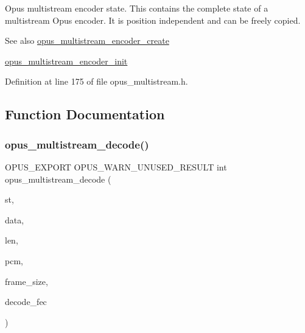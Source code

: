 Opus multistream encoder state. This contains the complete state of a multistream Opus encoder. It is position independent and can be freely copied. \begin{DoxySeeAlso}{See also}
\mbox{\hyperlink{group__opus__multistream_ga984c19f4faa4db82370eb907f8eaf452}{opus\+\_\+multistream\+\_\+encoder\+\_\+create}} 

\mbox{\hyperlink{group__opus__multistream_gaf9045180b3a93d7cc3d1197859b767a8}{opus\+\_\+multistream\+\_\+encoder\+\_\+init}} 
\end{DoxySeeAlso}


Definition at line 175 of file opus\+\_\+multistream.\+h.



\subsection{Function Documentation}
\mbox{\label{group__opus__multistream_ga2db65790cd7e0890a031b2eb17452d7b}} 
\subsubsection{\texorpdfstring{opus\_multistream\_decode()}{opus\_multistream\_decode()}}
{\footnotesize\ttfamily O\+P\+U\+S\+\_\+\+E\+X\+P\+O\+RT O\+P\+U\+S\+\_\+\+W\+A\+R\+N\+\_\+\+U\+N\+U\+S\+E\+D\+\_\+\+R\+E\+S\+U\+LT int opus\+\_\+multistream\+\_\+decode (\begin{DoxyParamCaption}\item[{\mbox{\hyperlink{group__opus__multistream_gad3497495deb9a8ace82e76cd4f93e0e4}{Opus\+M\+S\+Decoder}} $\ast$}]{st,  }\item[{const unsigned char $\ast$}]{data,  }\item[{\mbox{\hyperlink{opus__types_8h_aa4d309d6f80b99dbabebc8f98879ab9a}{opus\+\_\+int32}}}]{len,  }\item[{\mbox{\hyperlink{opus__types_8h_acc9ed7cf60479eb81f9648c6ec27dc26}{opus\+\_\+int16}} $\ast$}]{pcm,  }\item[{int}]{frame\+\_\+size,  }\item[{int}]{decode\+\_\+fec }\end{DoxyParamCaption})}

